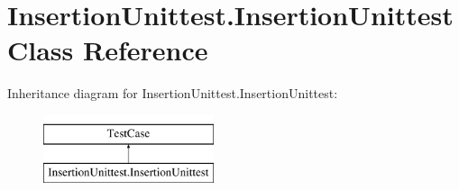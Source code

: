 \hypertarget{classInsertionUnittest_1_1InsertionUnittest}{\section{Insertion\-Unittest.\-Insertion\-Unittest Class Reference}
\label{classInsertionUnittest_1_1InsertionUnittest}
}
Inheritance diagram for Insertion\-Unittest.\-Insertion\-Unittest\-:\begin{figure}[H]
\begin{center}
\leavevmode
\includegraphics[height=2.000000cm]{classInsertionUnittest_1_1InsertionUnittest}
\end{center}
\end{figure}
